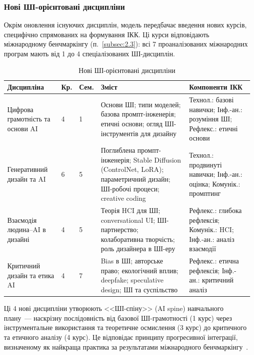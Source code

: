 \subsubsection{Нові ШІ-орієнтовані дисципліни}\label{sssec:3.2.8}

Окрім оновлення існуючих дисциплін, модель передбачає введення нових курсів, специфічно спрямованих на формування ІКК. Ці курси відповідають міжнародному бенчмаркінгу (п.~\ref{subsec:2.3}): всі 7 проаналізованих міжнародних програм мають від 1 до 4 спеціалізованих ШІ-дисциплін.

\begin{table}[htbp]
\centering
\caption{Нові ШІ-орієнтовані дисципліни}\label{tab:new-ai-courses}
\small
\begin{tabularx}{\textwidth}{@{}p{}p{}p{}p{}p{}@{}}
\toprule
\textbf{Дисципліна} & \textbf{Кр.} & \textbf{Сем.} & \textbf{Зміст} & \textbf{Компоненти ІКК} \\
\midrule
Цифрова грамотність та основи AI & 4 & 1 & Основи ШІ; типи моделей; базова промпт-інженерія; етичні основи; огляд ШІ-інструментів для дизайну & Технол.: базові навички; Інф.-ан.: розуміння ШІ; Рефлекс.: етичні основи \\
\addlinespace
Генеративний дизайн та AI & 6 & 5 & Поглиблена промпт-інженерія; Stable Diffusion (ControlNet, LoRA); параметричний дизайн; ШІ-робочі процеси; creative coding & Технол.: продвинуті навички; Інф.-ан.: оцінка; Комунік.: промптинг \\
\addlinespace
Взаємодія людина--AI в дизайні & 4 & 5 & Теорія HCI для ШІ; conversational UI; ШІ-партнерство; колаборативна творчість; роль дизайнера в ШІ-еру & Рефлекс.: глибока рефлексія; Комунік.: HCI; Інф.-ан.: аналіз взаємодії \\
\addlinespace
Критичний дизайн та етика AI & 4 & 7 & Bias в ШІ; авторське право; екологічний вплив; deepfake; speculative design; ШІ та суспільство & Рефлекс.: етична рефлексія; Інф.-ан.: критичний аналіз \\
\bottomrule
\end{tabularx}
\end{table}

Ці 4 нові дисципліни утворюють <<ШІ-спіну>> (AI spine) навчального плану~--- наскрізну послідовність від базової ШІ-грамотності (1 курс) через інструментальне використання та теоретичне осмислення (3 курс) до критичного та етичного аналізу (4 курс). Це відповідає принципу прогресивної інтеграції, визначеному як найкраща практика за результатами міжнародного бенчмаркінгу~\cite{Musiienko2025DesignEducation}.

